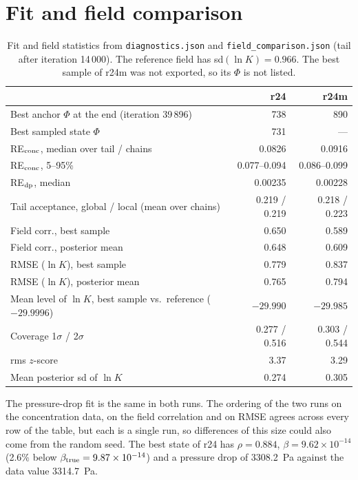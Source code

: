 \documentclass[11pt]{article}
\begin{document}
\section{Fit and field comparison}
\begin{table}[h]\centering
\begin{tabular}{lrr}\toprule
 & r24 & r24m \\ \midrule
Best anchor $\Phi$ at the end (iteration 39\,896) & 738 & 890 \\
Best sampled state $\Phi$ & 731 & --- \\
RE$_{\rm conc}$, median over tail / chains & 0.0826 & 0.0916 \\
RE$_{\rm conc}$, 5--95\% & 0.077--0.094 & 0.086--0.099 \\
RE$_{\rm dp}$, median & 0.00235 & 0.00228 \\
Tail acceptance, global / local (mean over chains) & 0.219 / 0.219 & 0.218 / 0.223 \\
\midrule
Field corr., best sample & 0.650 & 0.589 \\
Field corr., posterior mean & 0.648 & 0.609 \\
RMSE ($\ln K$), best sample & 0.779 & 0.837 \\
RMSE ($\ln K$), posterior mean & 0.765 & 0.794 \\
Mean level of $\ln K$, best sample vs.\ reference ($-29.9996$) & $-29.990$ & $-29.985$ \\
Coverage 1$\sigma$ / 2$\sigma$ & 0.277 / 0.516 & 0.303 / 0.544 \\
rms $z$-score & 3.37 & 3.29 \\
Mean posterior sd of $\ln K$ & 0.274 & 0.305 \\ \bottomrule
\end{tabular}
\caption{Fit and field statistics from \texttt{diagnostics.json} and \texttt{field\_comparison.json} (tail after iteration 14\,000). The reference field has sd$(\ln K)=0.966$. The best sample of r24m was not exported, so its $\Phi$ is not listed.}
\end{table}
The pressure-drop fit is the same in both runs. The ordering of the two runs on the concentration data, on the field correlation and on RMSE agrees across every row of the table, but each is a single run, so differences of this size could also come from the random seed.
The best state of r24 has $\rho=0.884$, $\beta=9.62\times10^{-14}$ (2.6\% below $\beta_{\rm true}=9.87\times10^{-14}$) and a pressure drop of 3308.2~Pa against the data value 3314.7~Pa.
\end{document}
